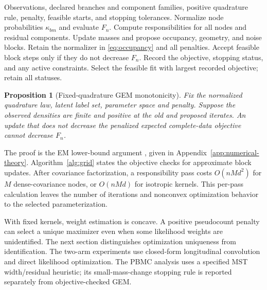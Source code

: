 \documentclass[10pt]{article}
\newtheorem{proposition}{Proposition}
\theoremstyle{definition}
\theoremstyle{plain}
\begin{document}
\begin{algorithm}[H]
\caption{Objective-checked finite-grid estimation}
\label{alg:grid}
\begin{algorithmic}[1]
\Require Observations, declared branches and component families, positive
quadrature rule, penalty, feasible starts, and stopping tolerances.
 \State Normalize node probabilities $\kappa_{bm}$ and evaluate $F_n$.
 \Repeat
  \State Compute responsibilities for all nodes and residual components.
  \State Update masses and propose occupancy, geometry, and noise blocks.
  \State Retain the normalizer in \eqref{eq:occupancy} and all penalties.
  \State Accept feasible block steps only if they do not decrease $F_n$.
 \State Record the objective, stopping status, and any active constraints.
\EndFor
\State Select the feasible fit with largest recorded objective; retain all statuses.
\end{algorithmic}
\end{algorithm}

\begin{proposition}[Fixed-quadrature GEM monotonicity]
\label{prop:gem}
Fix the normalized quadrature law, latent label set, parameter space and
penalty. Suppose the observed densities are finite and positive at the old
and proposed iterates. An update that does not decrease the penalized
expected complete-data objective cannot decrease $F_n$.
\end{proposition}
The proof is the EM lower-bound argument
\citep{dempster1977em,wu1983convergence}, given in
Appendix~\ref{app:numerical-theory}. Algorithm~\ref{alg:grid}
states the objective checks for approximate block updates. After covariance
factorization, a responsibility pass costs $O(nMd^2)$ for $M$ dense-covariance
nodes, or $O(nMd)$ for isotropic kernels. This per-pass calculation leaves the
number of iterations and nonconvex optimization behavior to the selected
parameterization.

With fixed kernels, weight estimation is concave. A positive pseudocount
penalty can select a unique maximizer even when some likelihood weights are
unidentified. The next section distinguishes optimization uniqueness from
identification. The two-arm experiments use closed-form longitudinal
convolution and direct likelihood optimization. The PBMC analysis uses a
specified MST width/residual heuristic; its small-mass-change stopping rule
is reported separately from objective-checked GEM.
\end{document}
